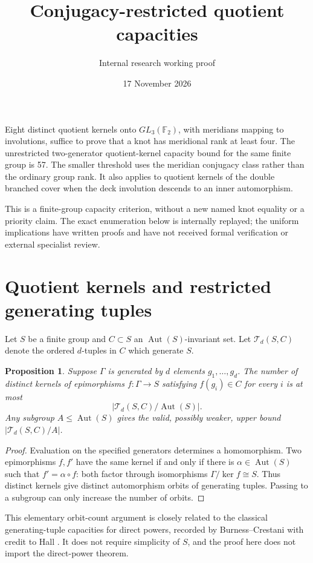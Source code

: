 \documentclass[11pt]{article}
\title{Conjugacy-restricted quotient capacities}
\author{Internal research working proof}
\date{17 November 2026}
\newtheorem{proposition}[theorem]{Proposition}
\newcommand{\Aut}{\operatorname{Aut}}
\newcommand{\F}{\mathbb F}
\begin{document}
\maketitle

Eight distinct quotient kernels onto $GL_3(\F_2)$, with meridians
mapping to involutions, suffice to prove that a knot has meridional
rank at least four.  The unrestricted two-generator quotient-kernel
capacity bound for the same finite group is 57.  The smaller threshold
uses the meridian conjugacy class rather than the ordinary group rank.
It also applies to quotient kernels of the double branched cover when
the deck involution descends to an inner automorphism.

This is a finite-group capacity criterion, without a new named knot
equality or a priority claim.  The exact enumeration below is internally
replayed; the uniform implications have written proofs and have not
received formal verification or external specialist review.

\section{Quotient kernels and restricted generating tuples}

Let $S$ be a finite group and $C\subset S$ an $\Aut(S)$-invariant set.
Let $\mathcal T_d(S,C)$ denote the ordered $d$-tuples in $C$ which
generate $S$.

\begin{proposition}\label{prop:capacity}
Suppose $\Gamma$ is generated by $d$ elements $g_1,\ldots,g_d$.
The number of distinct kernels of epimorphisms $f:\Gamma\to S$
satisfying $f(g_i)\in C$ for every $i$ is at most
\[
                    |\mathcal T_d(S,C)/\Aut(S)|.
\]
Any subgroup $A\le\Aut(S)$ gives the valid, possibly weaker, upper
bound $|\mathcal T_d(S,C)/A|$.
\end{proposition}
\begin{proof}
Evaluation on the specified generators determines a homomorphism.
Two epimorphisms $f,f'$ have the same kernel if and only if there is
$\alpha\in\Aut(S)$ such that $f'=\alpha\circ f$: both factor through
isomorphisms $\Gamma/\ker f\cong S$.  Thus distinct kernels give
distinct automorphism orbits of generating tuples.  Passing to a
subgroup can only increase the number of orbits.
\end{proof}

This elementary orbit-count argument is closely related to the
classical generating-tuple capacities for direct powers, recorded by
Burness--Crestani with credit to Hall \cite[p.~2]{bc}.  It does not
require simplicity of $S$, and the proof here does not import the
direct-power theorem.
\end{document}
